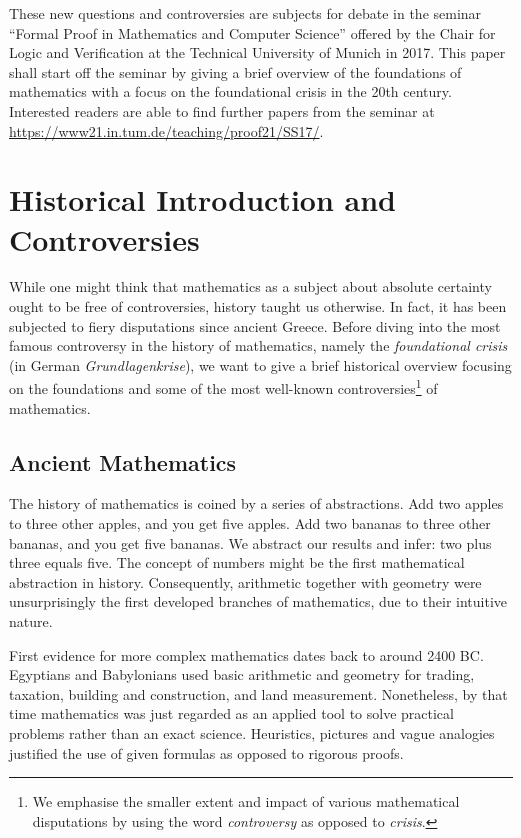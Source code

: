 \documentclass{article}
\begin{document}
These new questions and controversies are subjects for debate in the seminar ``Formal Proof in Mathematics and Computer Science'' offered by the Chair for Logic and Verification at the Technical University of Munich in 2017. This paper shall start off the seminar by giving a brief overview of the foundations of mathematics with a focus on the foundational crisis in the 20th century. Interested readers are able to find further papers from the seminar at \url{https://www21.in.tum.de/teaching/proof21/SS17/}.
\newpage
{}
\tableofcontents
{}
\newpage

\section{Historical Introduction and Controversies}
While one might think that mathematics as a subject about absolute certainty ought to be free of controversies, history taught us otherwise. In fact, it has been subjected to fiery disputations since ancient Greece. Before diving into the most famous controversy in the history of mathematics, namely the \textit{foundational crisis} (in German \textit{Grundlagenkrise}), we want to give a brief historical overview focusing on the foundations and some of the most well-known controversies\footnote{We emphasise the smaller extent and impact of various mathematical disputations by using the word \textit{controversy} as opposed to \textit{crisis}.} of mathematics.

\subsection{Ancient Mathematics}

The history of mathematics is coined by a series of abstractions.
Add two apples to three other apples, and you get five apples. Add two bananas to three other bananas, and you get five bananas. We abstract our results and infer: two plus three equals five. The concept of numbers might be the first mathematical abstraction in history. Consequently, arithmetic together with geometry were unsurprisingly the first developed branches of mathematics, due to their intuitive nature.

First evidence for more complex mathematics dates back to around 2400 BC\@. Egyptians and Babylonians used basic arithmetic and geometry for trading, taxation, building and construction, and land measurement. Nonetheless, by that time mathematics was just regarded as an applied tool to solve practical problems rather than an exact science. Heuristics, pictures and vague analogies justified the use of given formulas as opposed to rigorous proofs.
\end{document}
